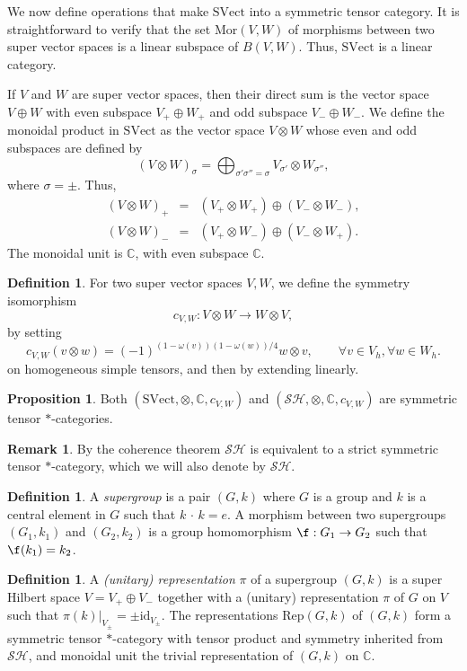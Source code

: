 \documentclass[12pt]{article}
\theoremstyle{definition}
\newtheorem{prop}[thm]{Proposition}
\theoremstyle{definition}
\newtheorem{defn}[thm]{Definition}
\newtheorem{note}[thm]{Remark}
\theoremstyle{remark}
\newcommand{\SVect}{\mathrm{SVect}}
\newcommand{\gp}{\,\cdot \,}
\def\2#1{{\mathcal #1}}
\def\7#1{{\mathbb #1}}
\def\om{\omega} \def\Om{\Omega} \def\dd{\partial} \def\D{\Delta}
\newcommand{\Mor}{\mathrm{Mor}}
\newcommand{\Rep}{\mathrm{Rep}}
\def\id{\mathrm{id}}
\begin{document}
We now define operations that make $\SVect$ into a
symmetric tensor category.  It is straightforward to
verify that the set $\Mor (V,W)$ of morphisms between
two super vector spaces is a linear subspace of
$B(V,W)$.  Thus, $\SVect$ is a linear category.

If $V$ and $W$ are super vector spaces, then their
direct sum is the vector space $V\oplus W$ with even
subspace $V_+\oplus W_+$ and odd subspace $V_-\oplus
W_-$.  We define the monoidal product in $\SVect$ as
the vector space $V\otimes W$ whose even and odd
subspaces are defined by
\[ (V\otimes W)_{\sigma }=\bigoplus _{\sigma '\sigma
  ''=\sigma}V_{\sigma '}\otimes W_{\sigma ''} ,\] where
$\sigma =\pm$.  Thus,
\begin{eqnarray*} (V\otimes W)_+ &=& (V_+\otimes W_+)\oplus (V_-\otimes W_-)  ,\\
  (V\otimes W)_- &=& (V_+\otimes W_-)\oplus (V_-\otimes
  W_+) .\end{eqnarray*} The monoidal unit is $\7C$,
with even subspace $\7C$.

\begin{defn} For two super vector spaces $V,W$, we
  define the symmetry isomorphism
  \[ c_{V,W}:V\otimes W\to W\otimes V ,\] by setting
  \[ c_{V,W}(v\otimes w)=(-1)^{(1-\om (v))(1-\om
    (w))/4} w\otimes v ,\qquad \forall v\in V_h,\forall
  w\in W_h. \] on homogeneous simple tensors, and then
  by extending linearly.
\end{defn}

\begin{prop} Both $(\SVect ,\otimes ,\7C,c_{V,W})$ and $(\2S\2H ,\otimes ,\7C
  ,c_{V,W})$ are symmetric tensor $*$-categories.
\end{prop}

\begin{note} By the coherence theorem $\2S\2H$ is equivalent to a strict symmetric
  tensor $*$-category, which we will also denote by $\2S\2H$.  
\end{note}

\begin{defn} A \emph{supergroup} is a pair $(G ,k )$ where $G$ is a group and $k$ is
  a central element in $G$ such that $k\gp k=e$.  A morphism between two supergroups
  $(G _1,k _1)$ and $(G _2,k_2)$ is a group homomorphism $\f:G _1\to G_2$ such that
  $\f(k_1)=k_2$.
\end{defn}

\begin{defn} A \emph{(unitary) representation} $\pi$ of
  a supergroup $(G,k)$ is a super Hilbert space
  $V=V_+\oplus V_-$ together with a (unitary)
  representation $\pi$ of $G$ on $V$ such that
  $\pi(k)|_{V_\pm}=\pm \id _{V_{\pm}}$.  The
  representations $\Rep (G,k)$ of $(G,k)$ form a
  symmetric tensor $*$-category with tensor product and
  symmetry inherited from $\2S\2H$, and monoidal unit
  the trivial representation of $(G,k)$ on
  $\7C$.  \end{defn}
\end{document}
